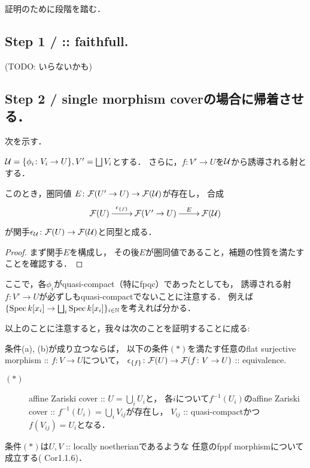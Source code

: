 \documentclass[a4paper, dvipdfmx]{jsarticle}
\begin{document}
証明のために段階を踏む．
\subsection{Step 1 / \tp{$\epsilon_{\covU}$} :: faithfull.}
    (TODO: いらないかも)

\subsection{Step 2 / single morphism coverの場合に帰着させる．}
    次を示す．
    \begin{Lemma}
        $\mathcal{U}=\{\phi_i \colon V_i \to U\}, V'=\bigsqcup V_i$とする．
        さらに，$f \colon V' \to U$を$\mathcal{U}$から誘導される射とする．

        このとき，圏同値 $E \colon \mathcal{F}(U' \to U) \to \mathcal{F}(\mathcal{U})$が存在し，
        合成
        \[\xymatrix{
            \shF(U) \ar[r]^-{\epsilon_{\{f\}}}& \shF(V' \to U) \ar[r]^-{E}& \shF(\covU)
        }\]
        が関手$\epsilon_{\mathcal{U}} \colon \mathcal{F}(U) \to \mathcal{F}(\mathcal{U})$と同型と成る．
    \end{Lemma}

    \begin{proof}
        まず関手$E$を構成し，
        その後$E$が圏同値であること，補題の性質を満たすことを確認する．
    \end{proof}

    \begin{Remark}
        ここで，各$\phi_i$がquasi-compact（特にfpqc）であったとしても，
        誘導される射$f \colon V' \to U$が必ずしもquasi-compactでないことに注意する．
        例えば$\{\operatorname{Spec} k[x_i] \to \bigsqcup_i \operatorname{Spec} k[x_i]\}_{i \in \mathbb{N}}$を考えれば分かる．

        以上のことに注意すると，我々は次のことを証明することに成る:
        \begin{Lemma}
            条件(a), (b)が成り立つならば，
            以下の条件$(*)$を満たす任意のflat surjective morphism :: $f \colon V \to U$について，
            $\epsilon_{\{f\}} \colon \mathcal{F}(U) \to \mathcal{F}(f \colon V \to U)$ :: equivalence.
            \begin{description}
                \item[$(*)$]
                    affine Zariski cover :: $U=\bigcup_i U_i$と，
                    各$i$について$f^{-1}(U_i)$のaffine Zariski cover :: $f^{-1}(U_i)=\bigcup_i V_{ij}$が存在し，
                    $V_{ij}$ :: quasi-compactかつ$f(V_{ij})=U_i$となる．
            \end{description}
        \end{Lemma}
        条件$(*)$は$U, V$ :: locally noetherianであるような
        任意のfppf morphismについて成立する(\cite{ASS} Cor1.1.6)．
    \end{Remark}
\end{document}
